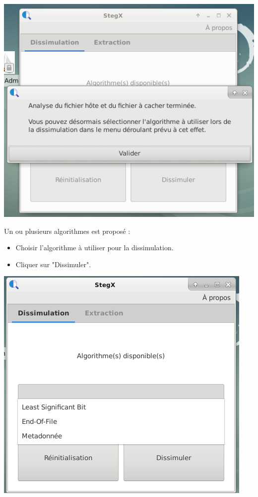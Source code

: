 \documentclass[11pt]{article}
\begin{document}
\vspace{0.5cm}
\hspace{2cm}
\includegraphics[scale=0.8]{pictures/insertion_2.png}
\vspace{1cm}

Un ou plusieurs algorithmes est proposé : 
\begin{itemize}
\item Choisir l'algorithme à utiliser pour la dissimulation.
\item Cliquer sur "Dissimuler". 
\end{itemize}

\vspace{0.5cm}
\hspace{2cm}
\includegraphics[scale=0.8]{pictures/insertion_3.png}
\end{document}
